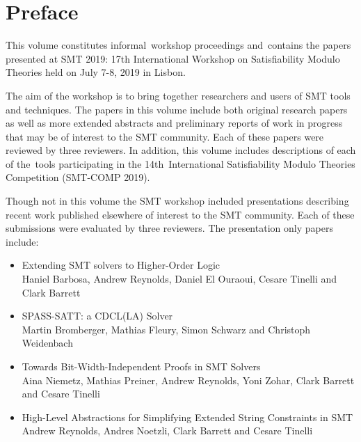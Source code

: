 \documentclass{easychair}
\begin{document}
\section*{Preface}

This volume constitutes informal\ workshop proceedings and\ contains
the papers presented at SMT 2019: 17th International Workshop on
Satisfiability Modulo Theories held on July 7-8, 2019 in Lisbon.

The aim of the workshop is to bring together researchers and users of
SMT tools and techniques. The papers in this volume include both
original research papers as well as more extended abstracts and
preliminary reports of work in progress that may be of interest to the
SMT community. Each of these papers were reviewed by three
reviewers. In addition, this volume includes descriptions of each of
the\ tools participating in the 14th\ International Satisfiability
Modulo Theories Competition (SMT-COMP 2019).


Though not in this volume the SMT workshop included presentations
describing recent work published elsewhere of interest to the SMT
community. Each of these submissions were evaluated by three
reviewers. The presentation only papers include:




\begin{itemize}

\item 
Extending SMT solvers to Higher-Order Logic\\
  Haniel Barbosa, Andrew Reynolds, Daniel El Ouraoui, Cesare Tinelli and Clark
  Barrett

\item 
SPASS-SATT: a CDCL(LA) Solver\\
  Martin Bromberger, Mathias
  Fleury, Simon Schwarz and Christoph Weidenbach

\item Towards Bit-Width-Independent Proofs in SMT Solvers\\
  Aina Niemetz, Mathias Preiner, Andrew Reynolds, Yoni Zohar, Clark Barrett and Cesare Tinelli

\item High-Level Abstractions for Simplifying Extended String Constraints in SMT\\
  Andrew Reynolds, Andres Noetzli, Clark Barrett and Cesare Tinelli

\end{itemize}
\end{document}
